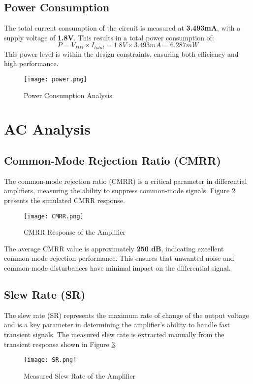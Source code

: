 \documentclass[a4paper,12pt]{article}
\begin{document}
\subsection{Power Consumption}
The total current consumption of the circuit is measured at \textbf{3.493mA}, with a supply voltage of \textbf{1.8V}. This results in a total power consumption of:
\begin{equation}
P = V_{DD} \times I_{total} = 1.8V \times 3.493mA = 6.287mW
\end{equation}
This power level is within the design constraints, ensuring both efficiency and high performance.

\begin{figure}[H]
\centering
\texttt{[image: power.png]}
\caption{Power Consumption Analysis}
\label{fig:power}
\end{figure}
\newpage
\section{AC Analysis}
\subsection{Common-Mode Rejection Ratio (CMRR)}
The common-mode rejection ratio (CMRR) is a critical parameter in differential amplifiers, measuring the ability to suppress common-mode signals. Figure \ref{fig:cmrr} presents the simulated CMRR response.

\begin{figure}[H]
\centering
\texttt{[image: CMRR.png]}
\caption{CMRR Response of the Amplifier}
\label{fig:cmrr}
\end{figure}

The average CMRR value is approximately \textbf{250 dB}, indicating excellent common-mode rejection performance. This ensures that unwanted noise and common-mode disturbances have minimal impact on the differential signal.

\subsection{Slew Rate (SR)}
The slew rate (SR) represents the maximum rate of change of the output voltage and is a key parameter in determining the amplifier's ability to handle fast transient signals. The measured slew rate is extracted manually from the transient response shown in Figure \ref{fig:sr}.

\begin{figure}[H]
\centering
\texttt{[image: SR.png]}
\caption{Measured Slew Rate of the Amplifier}
\label{fig:sr}
\end{figure}
\end{document}
